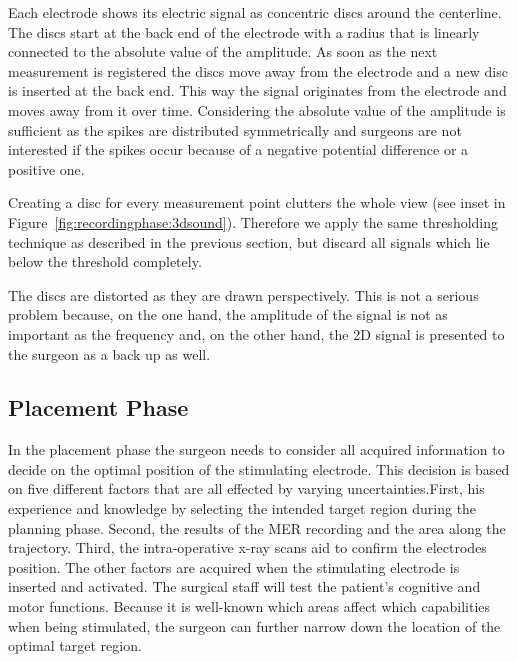 \documentclass{vgtc}                          %
\begin{document}
Each electrode shows its electric signal as concentric discs around the centerline. The discs start at the back end of the electrode with a radius that is linearly connected to the absolute value of the amplitude. As soon as the next measurement is registered the discs move away from the electrode and a new disc is inserted at the back end. This way the signal originates from the electrode and moves away from it over time. Considering the absolute value of the amplitude is sufficient as the spikes are distributed symmetrically and surgeons are not interested if the spikes occur because of a negative potential difference or a positive one. 

Creating a disc for every measurement point clutters the whole view (see inset in Figure~\ref{fig:recordingphase:3dsound}). Therefore we apply the same thresholding technique as described in the previous section, but discard all signals which lie below the threshold completely.

The discs are distorted as they are drawn perspectively. This is not a serious problem because, on the one hand, the amplitude of the signal is not as important as the frequency and, on the other hand, the 2D signal is presented to the surgeon as a back up as well.


\subsection{Placement Phase}\label{sec:overview:placement}
In the placement phase the surgeon needs to consider all acquired information to decide on the optimal position of the stimulating electrode. This decision is based on five different factors that are all effected by varying uncertainties.First, his experience and knowledge by selecting the intended target region during the planning phase. Second, the results of the MER recording and the area along the trajectory. Third, the intra-operative x-ray scans aid to confirm the electrodes position. The other factors are acquired when the stimulating electrode is inserted and activated. The surgical staff will test the patient's cognitive and motor functions. Because it is well-known which areas affect which capabilities when being stimulated, the surgeon can further narrow down the location of the optimal target region.%
\end{document}
